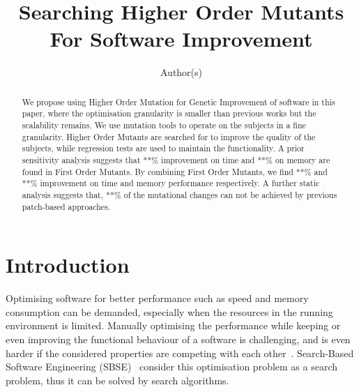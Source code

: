 \documentclass[oribibl]{llncs}
\begin{document}
\title{Searching Higher Order Mutants For Software Improvement}

\author{Author(s)
}



\maketitle

\begin{abstract}
We propose using Higher Order Mutation for Genetic Improvement of software in this paper, where the optimisation granularity is smaller than previous works but the scalability remains.
We use mutation tools to operate on the subjects in a fine granularity.
Higher Order Mutants are searched for to improve the quality of the subjects, while regression tests are used to maintain the functionality.
A prior sensitivity analysis suggests that **\% improvement on time and **\% on memory are found in First Order Mutants.
By combining First Order Mutants, we find **\% and **\% improvement on time and memory performance respectively.
A further static analysis suggests that, **\% of the mutational changes can not be achieved by previous patch-based approaches.
\end{abstract}

\section{Introduction}
\label{sec_intro}

Optimising software for better performance such as speed and memory consumption can be demanded, especially when the resources in the running environment is limited.
Manually optimising the performance while keeping or even improving the functional behaviour of a software is challenging, 
and is even harder if the considered properties are competing with each other~\cite{Harman:2012:GCC:2351676.2351678}.
Search-Based Software Engineering (SBSE)~\cite{Harman2001833} consider this optimisation problem as a search problem, thus it can be solved by search algorithms.
\end{document}
